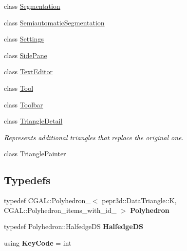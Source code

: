 \begin{DoxyCompactItemize}
\item 
class \mbox{\hyperlink{classpepr3d_1_1_segmentation}{Segmentation}}
\item 
class \mbox{\hyperlink{classpepr3d_1_1_semiautomatic_segmentation}{Semiautomatic\+Segmentation}}
\item 
class \mbox{\hyperlink{classpepr3d_1_1_settings}{Settings}}
\item 
class \mbox{\hyperlink{classpepr3d_1_1_side_pane}{Side\+Pane}}
\item 
class \mbox{\hyperlink{classpepr3d_1_1_text_editor}{Text\+Editor}}
\item 
class \mbox{\hyperlink{classpepr3d_1_1_tool}{Tool}}
\item 
class \mbox{\hyperlink{classpepr3d_1_1_toolbar}{Toolbar}}
\item 
class \mbox{\hyperlink{classpepr3d_1_1_triangle_detail}{Triangle\+Detail}}
\begin{DoxyCompactList}\small\item\em Represents additional triangles that replace the original one. \end{DoxyCompactList}\item 
class \mbox{\hyperlink{classpepr3d_1_1_triangle_painter}{Triangle\+Painter}}
\end{DoxyCompactItemize}
\subsection*{Typedefs}
\begin{DoxyCompactItemize}
\item 
\mbox{\label{namespacepepr3d_a563b915bfa736206efe7a9d727b6eb91}} 
typedef C\+G\+A\+L\+::\+Polyhedron\+\_$<$ pepr3d\+::\+Data\+Triangle\+::K, C\+G\+A\+L\+::\+Polyhedron\+\_\+items\+\_\+with\+\_\+id\+\_ $>$ {\bfseries Polyhedron}
\item 
\mbox{\label{namespacepepr3d_a57e58f67799ffb6171c38a38ccf540d3}} 
typedef Polyhedron\+::\+Halfedge\+DS {\bfseries Halfedge\+DS}
\item 
\mbox{\label{namespacepepr3d_af92da0512bc875cd394a2d2037f81c1c}} 
using {\bfseries Key\+Code} = int
\end{DoxyCompactItemize}
